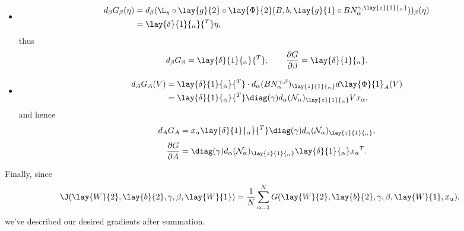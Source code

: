 \begin{itemize}
	\item \begin{align*}
		d_\beta G_\beta(\eta)&=d_\beta(\L_y\circ\lay{g}{2}\circ\lay{\Phi}{2}(B,b,\lay{g}{1}\circ BN_\alpha^{\gamma,\lay{z}{1}{_\alpha}}))_\beta(\eta)\\
		&=\lay{\delta}{1}{_\alpha}{^T}\eta,
	\end{align*}
	thus
	$$d_\beta G_\beta=\lay{\delta}{1}{_\alpha}{^T},\qquad\frac{\partial G}{\partial\beta}=\lay{\delta}{1}{_\alpha}.$$
	
	\item \begin{align*}
		d_AG_A(V)&=\lay{\delta}{1}{_\alpha}{^T}\cdot d_\alpha (BN_\alpha^{\gamma,\beta})_{\lay{z}{1}{_\alpha}}d\lay{\Phi}{1}_A(V)\\
		&=\lay{\delta}{1}{_\alpha}{^T}\diag(\gamma) d_\alpha(\mathcal{N}_\alpha)_{\lay{z}{1}{_\alpha}}Vx_\alpha,
	\end{align*}
	and hence
	$$d_AG_A=x_\alpha\lay{\delta}{1}{_\alpha}{^T}\diag(\gamma)d_\alpha(\mathcal{N}_\alpha)_{\lay{z}{1}{_\alpha}},$$
	$$\frac{\partial G}{\partial A}=\diag(\gamma)d_\alpha(\mathcal{N}_\alpha)_{\lay{z}{1}{_\alpha}}\lay{\delta}{1}{_\alpha}x_\alpha{^T}.$$
\end{itemize}

Finally, since
$$\J(\lay{W}{2},\lay{b}{2},\gamma,\beta,\lay{W}{1})=\frac{1}{N}\sum_{\alpha=1}^NG(\lay{W}{2},\lay{b}{2},\gamma,\beta,\lay{W}{1},x_\alpha),$$
we've described our desired gradients after summation.







